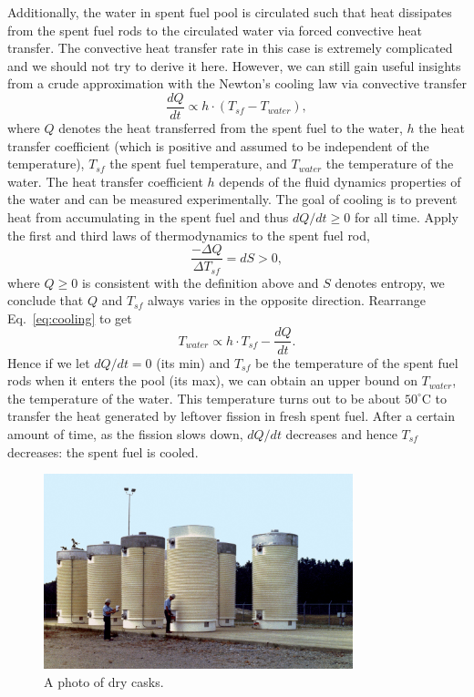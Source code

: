 \documentclass[nofootinbib,preprint,aps]{revtex4-1}
\begin{document}
    Additionally, the water in spent fuel pool is circulated such that heat dissipates from the spent
    fuel rods to the circulated water via forced convective heat transfer.
    The convective heat transfer rate in this case is
    extremely complicated and we should not try to derive it here. However, we can still gain useful insights
    from a crude approximation with the Newton's cooling law via convective transfer
    \begin{equation}
        \label{eq:cooling}
        \frac{dQ}{dt} \propto h\cdot (T_{sf} - T_{water}),
    \end{equation}
    where $Q$ denotes the heat transferred from the spent fuel to the water,
    $h$ the heat transfer coefficient (which is positive and assumed to be independent
    of the temperature), $T_{sf}$ the spent fuel temperature, and $T_{water}$ the temperature
    of the water.\cite[chapt. 1]{l13}
    The heat transfer coefficient $h$ depends of the fluid dynamics properties of the water and can
    be measured experimentally. The goal of
    cooling is to prevent heat from accumulating in the spent fuel and thus $dQ/dt \geq 0$ for all time.
    Apply the first and third laws of thermodynamics to the spent fuel rod,
    \begin{equation}
        \label{eq:first}
        \frac{-\Delta Q}{\Delta T_{sf}} = dS > 0,
    \end{equation}
    where $Q\geq 0$ is consistent with the definition above and $S$ denotes entropy, we conclude that $Q$ and $T_{sf}$ always varies in the opposite direction. Rearrange Eq.~\ref{eq:cooling} to get
    \begin{equation}
        T_{water} \propto h\cdot T_{sf} - \frac{dQ}{dt}.
    \end{equation}
    Hence if we let $dQ/dt=0$ (its min) and $T_{sf}$ be the temperature of the spent
    fuel rods when it enters the pool (its max), we
    can obtain an upper bound on $T_{water}$, the temperature of the water. This temperature turns out to
    be about $50^{\circ}$C to transfer the heat generated by leftover fission in fresh spent fuel. After a
    certain amount of time, as the fission slows down, $dQ/dt$ decreases and hence $T_{sf}$ decreases: the spent
    fuel is cooled.
        \begin{figure}
            \centering
            \includegraphics[width=0.8\textwidth]{dry_cask.jpg}
            \caption{A photo of dry casks.\cite{dcpic}}
            \label{fig:cask}
        \end{figure}
\end{document}
